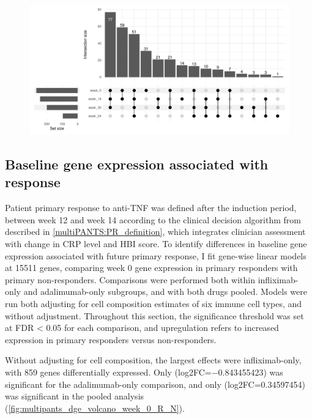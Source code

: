 \begin{outline}
\begin{figure}
    \centering
    \includegraphics[width=1.0\textwidth,page=1]{mainmatter/figures/chapter_04/process_pheno.pheno_filtered_dge.Visit_Label_upset.pdf}
    \caption{}
    \label{fig:multipants_visits_upset}
\end{figure}



\subsection{Baseline gene expression associated with response}


Patient primary response to anti-\gls{TNF} was defined after the induction period, between week 12 and week 14 according to the clinical decision algorithm from \textcite{kennedy2019PredictorsAntiTNFTreatment} described in \autoref{multiPANTS:PR_definition}, 
which integrates clinician assessment with change in \gls{CRP} level and \gls{HBI} score.
To identify differences in baseline gene expression associated with future primary response, 
I fit gene-wise linear models at 15511 genes, comparing week 0 gene expression in primary responders with primary non-responders.
Comparisons were performed both within infliximab-only and adalimumab-only subgroups, and with both drugs pooled.
Models were run both adjusting for cell composition estimates of six immune cell types, and without adjustment.
Throughout this section, the significance threshold was set at FDR < 0.05 for each comparison, and upregulation refers to increased expression in primary responders versus non-responders.

Without adjusting for cell composition, the largest effects were infliximab-only, with 859 genes differentially expressed.
Only  (log2FC=\num{-0.843455423}) was significant for the adalimumab-only comparison, 
and only  (log2FC=\num{0.34597454}) was significant in the pooled analysis (\autoref{fig:multipants_dge_volcano_week_0_R_N}).


\end{outline}
